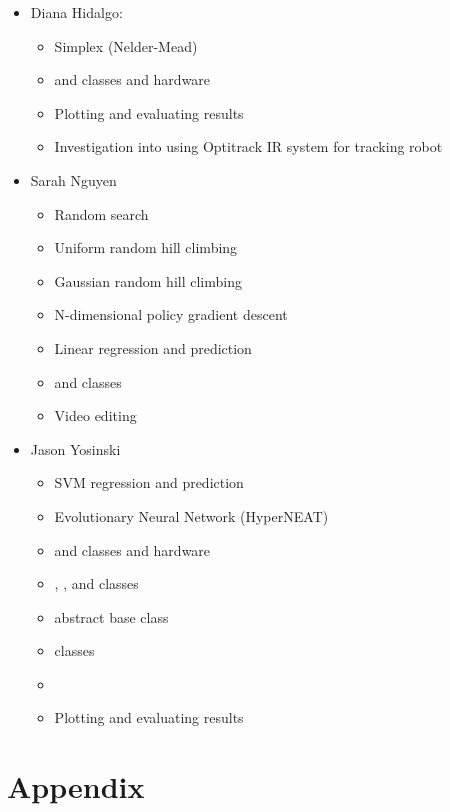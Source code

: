 \begin{itemize}

\item Diana Hidalgo: 
\begin{itemize}
\item Simplex (Nelder-Mead)
\item {} and  classes and hardware
\item Plotting and evaluating results
\item Investigation into using Optitrack IR system for tracking robot
\end{itemize}

\item Sarah Nguyen
\begin{itemize}
\item Random search
\item Uniform random hill climbing
\item Gaussian random hill climbing
\item N-dimensional policy gradient descent
\item Linear regression and prediction
\item {} and  classes
\item Video editing
\end{itemize}

\item Jason Yosinski
\begin{itemize}
\item SVM regression and prediction
\item Evolutionary Neural Network (HyperNEAT)
\item {} and  classes and hardware
\item {}, , and  classes
\item {} abstract base class
\item {} classes
\item {}
\item Plotting and evaluating results
\end{itemize}

\end{itemize}

\section{Appendix}

